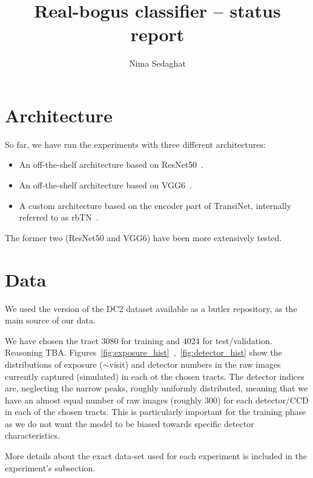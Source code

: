 \documentclass[DM,authoryear,toc]{lsstdoc}
\title{Real-bogus classifier -- status report}
\author{%
Nima Sedaghat
}
\date{\vcsDate}
\begin{document}
\maketitle


\section{Architecture}
So far, we have run the experiments with three different architectures:

\begin{itemize}
\item{An off-the-shelf architecture based on ResNet50~\citep{he2016deep}.}
\item{An off-the-shelf architecture based on VGG6~\citep{simonyan2014very}.}
\item{A custom architecture based on the encoder part of TransiNet, internally referred to as rbTN~\citep{sedaghat2018effective}.}
\end{itemize}

The former two (ResNet50 and VGG6) have been more extensively tested.

\section{Data}
We used the version of the DC2 dataset available as a butler repository, as the main source of our data.

We have chosen the tract 3080 for training and 4024 for test/validation. Reasoning TBA.
Figures~\ref{fig:exposure_hist}~,~\ref{fig:detector_hist} show the distributions of exposure ($\sim$visit) and detector numbers in the raw images currently captured (simulated) in each ot the chosen tracts. The detector indices are, neglecting the narrow peaks, roughly uniformly distributed, meaning that we have an almost equal number of raw images (roughly 300) for each detector/CCD in each of the chosen tracts. This is particularly important for the training phase as we do not want the model to be biased towards specific detector characteristics.

More details about the exact data-set used for each experiment is included in the experiment's subsection.
\end{document}
